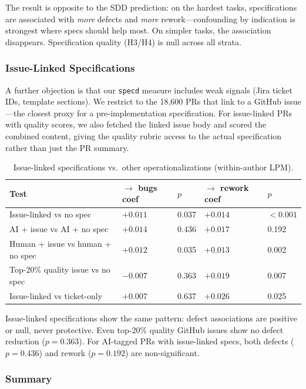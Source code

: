 \documentclass[a4paper,UKenglish,cleveref,autoref,thm-restate]{lipics-v2021}
\begin{document}
The result is opposite to the SDD prediction: on the hardest tasks, specifications are associated with \emph{more} defects and \emph{more} rework---confounding by indication is strongest where specs should help most. On simpler tasks, the association disappears. Specification quality (H3/H4) is null across all strata.

\subsubsection{Issue-Linked Specifications}

A further objection is that our \texttt{specd} measure includes weak signals (Jira ticket IDs, template sections). We restrict to the 18,600 PRs that link to a GitHub issue---the closest proxy for a pre-implementation specification. For issue-linked PRs with quality scores, we also fetched the linked issue body and scored the combined content, giving the quality rubric access to the actual specification rather than just the PR summary.

\begin{table}[t]
\centering
\caption{Issue-linked specifications vs.\ other operationalizations (within-author LPM).}
\label{tab:issue-linked}
\begin{tabular}{@{}lllll@{}}
\toprule
\textbf{Test} & \textbf{$\rightarrow$ bugs coef} & \textbf{$p$} & \textbf{$\rightarrow$ rework coef} & \textbf{$p$} \\
\midrule
Issue-linked vs no spec & $+0.011$ & 0.037 & $+0.014$ & $< 0.001$ \\
AI + issue vs AI + no spec & $+0.014$ & 0.436 & $+0.017$ & 0.192 \\
Human + issue vs human + no spec & $+0.012$ & 0.035 & $+0.013$ & 0.002 \\
Top-20\% quality issue vs no spec & $-0.007$ & 0.363 & $+0.019$ & 0.007 \\
Issue-linked vs ticket-only & $+0.007$ & 0.637 & $+0.026$ & 0.025 \\
\bottomrule
\end{tabular}
\end{table}

Issue-linked specifications show the same pattern: defect associations are positive or null, never protective. Even top-20\% quality GitHub issues show no defect reduction ($p = 0.363$). For AI-tagged PRs with issue-linked specs, both defects ($p = 0.436$) and rework ($p = 0.192$) are non-significant.

\subsubsection{Summary}
\end{document}
